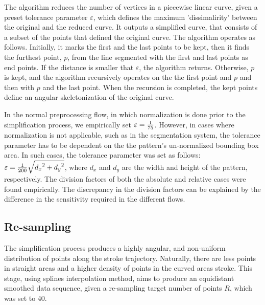 \iftoggle{edit-mode}{\hspace{0pt}\marginpar{The Douglas-Peucker algorithm}}{}
The algorithm reduces the number of vertices in a piecewise linear curve, given a preset tolerance parameter $\varepsilon$, which defines the maximum 'dissimalirity' between the original and the reduced curve.
It outputs a simplified curve, that consists of a subset of the points that defined the original curve.
The algorithm operates as follows. 
Initially, it marks the first and the last points to be kept, then it finds the furthest point, $p$, from the line segmented with the first and last points as end points.
If the distance is smaller that $\varepsilon$, the algorithm returns. 
Otherwise, $p$ is kept, and the algorithm recursively operates on the the first point and $p$ and then with $p$ and the last point.
When the recursion is completed, the kept points define an angular skeletonization of the original curve.

\iftoggle{edit-mode}{\hspace{0pt}\marginpar{Different tolerance parameters}}{}
In the normal preprocessing flow, in which normalization is done prior to the simplification process, we empirically set $\varepsilon  = {1 \over 75}$.
However, in cases where normalization is not applicable, such as in the segmentation system, the tolerance parameter has to be dependent on the the pattern's un-normalized bounding box area. 
In such cases, the tolerance parameter was set as follows: $\varepsilon  = {1 \over {200}}\sqrt {{d_x}^2 + {d_y}^2}$, where $d_x$ and $d_y$ are the width and height of the pattern, respectively. 
The division factors of both the absolute and relative cases were found empirically. 
The discrepancy in the division factors can be explained by the difference in the sensitivity required in the different flows. 

\subsection{Re-sampling}
\iftoggle{edit-mode}{\hspace{0pt}\marginpar{Goal}}{}
The simplification process produces a highly angular, and non-uniform distribution of points along the stroke trajectory.
Naturally, there are less points in straight areas and a higher density of points in the curved areas stroke. 
This stage, using splines interpolation method, aims to produce an equidistant smoothed data sequence, given a re-sampling target number of points $R$, which was set to 40. 

